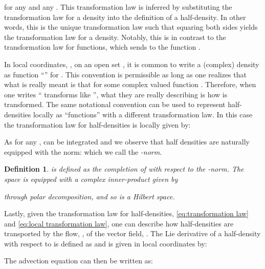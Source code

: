 \documentclass[final,leqno]{amsart}
\newtheorem{definition}[theorem]{Definition}
\begin{document}
for any  and any .
This transformation law is inferred by substituting the transformation law for a density into the definition of a half-density.
In other words, this is the unique transformation law such that squaring both sides yields the transformation law for a density.
Notably, this is in contrast to the transformation law for functions, which sends  to the function .

In local coordinates, , on an open set , it is common to write a (complex) density  as function ``'' for .
This convention is permissible as long as one realizes that what is really meant is that  for some complex valued function .
Therefore, when one writes  `` transforms like '', what they are really describing is how  is transformed.
The same notational convention can be used to represent half-densities locally as ``functions'' with a different transformation law.
In this case the transformation law for half-densities is locally given by:


As  for any ,  can be integrated and we observe that half densities are naturally equipped with the norm:  which we call the \emph{-norm}.
\begin{definition}
	 is defined as the completion of  with respect to the -norm.
	The space  is equipped with a complex inner-product given by
	
	through polar decomposition, and so  is a Hilbert space.
\end{definition}

Lastly, given the transformation law for half-densities, \eqref{eq:transformation law} and \eqref{eq:local transformation law}, one can describe how half-densities are transported by the flow, , of the vector field, . 
The Lie derivative of a half-density with respect to  is defined as  and is given in local coordinates by:

The advection equation can then be written as:
\end{document}
